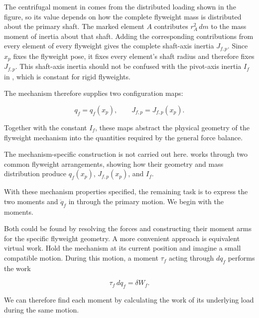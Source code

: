 \documentclass[11pt]{report}
\numberwithin{equation}{section}
\begin{document}
The centrifugal moment in
 comes from the distributed loading
shown in the figure, so its value depends on how the complete flyweight mass
is distributed about the primary shaft. The marked element \(A\) contributes
\(r_A^2\,dm\) to the mass moment of inertia about that shaft. Adding the
corresponding contributions from every element of every flyweight gives the
complete shaft-axis inertia \(J_{f,p}\). Since \(x_p\) fixes the flyweight
pose, it fixes every element's shaft radius and therefore fixes \(J_{f,p}\).
This shaft-axis inertia should not be confused with the pivot-axis inertia
\(I_f\) in , which is constant for
rigid flyweights.

The mechanism therefore supplies two configuration maps:

\begin{equation}
    q_f=q_f(x_p),
    \qquad
    J_{f,p}=J_{f,p}(x_p).
    \label{eq:primary_flyweight_geometry_maps}
\end{equation}

Together with the constant \(I_f\), these maps abstract the physical geometry
of the flyweight mechanism into the quantities required by the general force
balance.

\begin{remarkbox}
The mechanism-specific construction is not carried out here.
 works through two common
flyweight arrangements, showing how their geometry and mass distribution
produce \(q_f(x_p)\), \(J_{f,p}(x_p)\), and \(I_f\).
\end{remarkbox}

With these mechanism properties specified, the remaining task is to express
the two moments and \(\ddot q_f\) in
 through the primary motion. We
begin with the moments.

Both could be found by resolving the forces and constructing their moment arms
for the specific flyweight geometry. A more convenient approach is equivalent
virtual work. Hold the mechanism at its current position and imagine a small
compatible motion. During this motion, a moment \(\tau_f\) acting through
\(dq_f\) performs the work

\begin{equation}
    \tau_f\,dq_f = \delta W_f.
\end{equation}

We can therefore find each moment by calculating the work of its underlying
load during the same motion.
\end{document}
